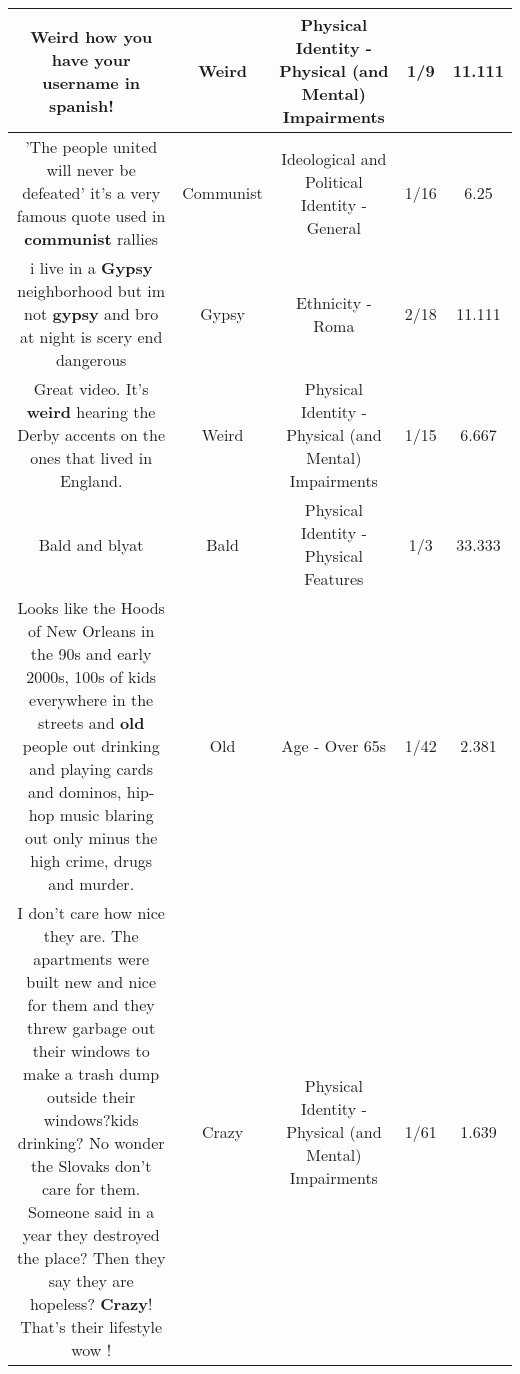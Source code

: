 \documentclass[11pt]{article}
\newlength\mylength
\begin{document}
\begin{center}
\begin{longtable}{|C{.65\mylength}|C{.30\mylength}|C{.12\mylength}|C{.12\mylength}|C{.12\mylength}|}
  \small Weird how you have your username in spanish! 👀🇲🇽\normalsize   & Weird & Physical Identity - Physical (and Mental) Impairments & 1/9 & 11.111 \\  \hline
  \small 'The people united will never be defeated' it's a very famous quote used in \textbf{communist} rallies\normalsize   & Communist &  Ideological and Political Identity - General & 1/16 & 6.25 \\  \hline
  \small i live in a \textbf{Gypsy} neighborhood but im not \textbf{gypsy} and  bro at 
night is scery end dangerous\normalsize   & Gypsy & Ethnicity - Roma & 2/18 & 11.111 \\  \hline
  \small Great video. It's \textbf{weird} hearing the Derby accents on the ones that lived in England.\normalsize   & Weird & Physical Identity - Physical (and Mental) Impairments & 1/15 & 6.667 \\  \hline
  \small Bald and blyat\normalsize   & Bald & Physical Identity - Physical Features & 1/3 & 33.333 \\  \hline
  \small Looks like the Hoods of New Orleans in the 90s and early 2000s, 100s of kids everywhere in the streets and \textbf{old} people out drinking and playing cards and dominos, hip-hop music blaring out only minus the high crime, drugs and murder.\normalsize   & Old & Age - Over 65s & 1/42 & 2.381 \\  \hline
  \small I don't care how nice they are. The apartments were built new and nice for them and they threw garbage out their windows to make a trash dump outside their windows?kids drinking? No wonder the Slovaks don't care for them. Someone said in a year they destroyed the place? Then they say they are hopeless? \textbf{Crazy}! That's their lifestyle wow !\normalsize   & Crazy & Physical Identity - Physical (and Mental) Impairments & 1/61 & 1.639 \\  \hline

\end{longtable}
\end{center}
\end{document}
